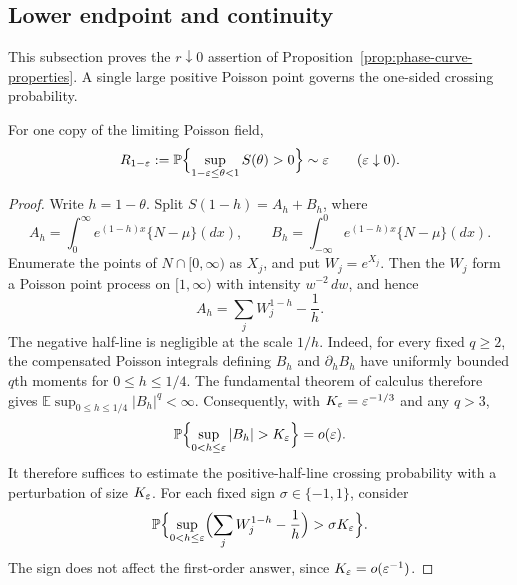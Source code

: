 
\subsection{Lower endpoint and continuity}

This subsection proves the \(r\downarrow0\) assertion of
Proposition~\ref{prop:phase-curve-properties}. A single large positive Poisson
point governs the one-sided crossing probability.
\begin{lemma}
\label{lem:endpoint-one-large-jump}
For one copy of the limiting Poisson field,
\[
    R_{1-\varepsilon}
    :=
    \mathbb P\Bigl\{
        \sup_{1-\varepsilon\le\theta<1}S(\theta)>0
    \Bigr\}
    \sim \varepsilon
    \qquad(\varepsilon\downarrow0).
\]
\end{lemma}

\begin{proof}
Write $h=1-\theta$. Split $S(1-h)=A_h+B_h$, where
\[
    A_h
    =
    \int_0^\infty e^{(1-h)x}\{N-\mu\}(dx),
    \qquad
    B_h
    =
    \int_{-\infty}^0 e^{(1-h)x}\{N-\mu\}(dx).
\]
Enumerate the points of \(N\cap[0,\infty)\) as \(X_j\), and put
\(W_j=e^{X_j}\). Then the \(W_j\) form a Poisson point process on
\([1,\infty)\) with intensity \(w^{-2}\,dw\), and hence
\[
    A_h=\sum_j W_j^{1-h}-\frac1h .
\]
The negative half-line is negligible at the scale \(1/h\). Indeed, for every
fixed \(q\ge2\), the compensated Poisson integrals defining \(B_h\) and
\(\partial_hB_h\) have uniformly bounded \(q\)th moments for
\(0\le h\le1/4\). The fundamental theorem of calculus therefore gives
\(\mathbb E\sup_{0\le h\le1/4}|B_h|^q<\infty\).
Consequently, with \(K_\varepsilon=\varepsilon^{-1/3}\) and any \(q>3\),
\[
    \mathbb P\Bigl\{
        \sup_{0<h\le\eps}|B_h|>K_\eps
    \Bigr\}
    =
    o(\eps).
\]
It therefore suffices to estimate the positive-half-line crossing probability
with a perturbation of size \(K_\varepsilon\). For each fixed sign
$\sigma\in\{-1,1\}$, consider
\[
    \mathbb P\Bigl\{
        \sup_{0<h\le\varepsilon}
        \Bigl(\sum_j W_j^{1-h}-\frac1h\Bigr)
        >\sigma K_\varepsilon
    \Bigr\}.
\]
The sign does not affect the first-order answer, since $K_\varepsilon=o(\varepsilon^{-1})$.


\end{proof}
